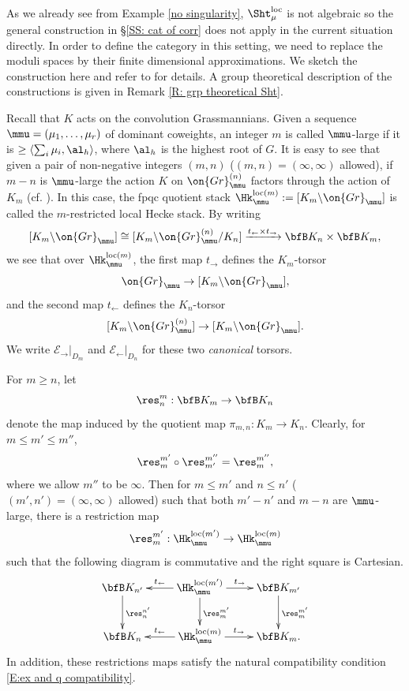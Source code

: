 \documentclass[11pt]{amsart}
\theoremstyle{definition}
\theoremstyle{definition}
\theoremstyle{definition}
\numberwithin{equation}{subsection}
\def\calE{\mathcal{E}}
\newcommand{\Gr}{{\on{Gr}}}
\newcommand{\loc}{\mathrm{loc}}
\newcommand{\leftone}{\leftarrow}
\newcommand{\rightone}{\to}
\begin{document}
As we already see from Example \ref{no singularity}, $\Sht^\loc_\mu$ is not algebraic so the general construction in \S \ref{SS: cat of corr} does not apply in the current situation directly. In order to define the category in this setting, we need to replace the moduli spaces by their finite dimensional approximations. 
We sketch the construction here and refer to  \cite[\S 5]{XZ} for details. A group theoretical description of the constructions is given in Remark \ref{R: grp theoretical Sht}.


Recall that $K$ acts on the convolution Grassmannians. Given a sequence $\mmu=(\mu_1,\ldots,\mu_r)$ of dominant coweights, an integer $m$ is called $\mmu$-large if it is $\geq \langle\sum_i\mu_i,\al_h\rangle$, where $\al_h$ is the highest root of $G$.
It is easy to see that given a pair of non-negative integers $(m,n)$ ($(m,n)=(\infty,\infty)$ allowed), if $m-n$ is $\mmu$-large
the action $K$ on $\Gr_\mmu^{(n)}$ factors through the action of $K_{m}$ (cf. \cite[Lemma 3.1.7]{XZ}). In this case, the fpqc quotient stack 
$\Hk^{\loc(m)}_\mmu:=[K_m\backslash \Gr_\mmu]$ is called the $m$-restricted local Hecke stack. 
By writing
\[
[K_m\backslash\Gr_\mmu]\cong [K_m\backslash\Gr^{(n)}_\mmu/K_n]\xrightarrow{t_\leftone\times t_\rightone} \bfB K_n\times \bfB K_m,
\]
we see that over $\Hk_{\mmu}^{\loc(m)}$, the first map $t_\rightone$ defines the $K_m$-torsor 
\begin{equation*}\label{torsor2}
\Gr_\mmu \to [K_m\backslash\Gr_\mmu],
\end{equation*}
and the second map $t_\leftone$ defines the $K_n$-torsor
\begin{equation*}\label{torsor1}
[K_m\backslash\Gr_{\mmu}^{(n)}]\to  [K_m\backslash\Gr_\mmu].
\end{equation*}
We write $\calE_{\rightone}|_{D_{m}}$ and $\calE_{\leftone}|_{D_n}$ for these two \emph{canonical} torsors. 

For $m\geq n$, let 
$$\res^m_n: \bfB K_m\to \bfB K_n$$ 
denote the map induced by the quotient map $\pi_{m,n}:K_m\to K_n$. Clearly, for $m\leq m'\leq m''$,
\begin{equation}
\label{E:ex and q compatibility}
\res_{m}^{m'} \circ \res_{m'}^{m''} = \res_{m}^{m''},
\end{equation}
where we allow $m''$ to be $\infty$.
Then for $m\leq m'$ and $n\leq n'$ ($(m',n')=(\infty,\infty)$ allowed) such that both $m'-n'$ and $m-n$ are $\mmu$-large, there
is a restriction map
$$\res^{m'}_m: \Hk^{\loc(m')}_{\mmu}\to \Hk^{\loc(m)}_{\mmu}$$ such that
the following diagram is commutative and the right square is Cartesian.
\begin{equation*}
\label{E:restriction and torsor commutative}
\xymatrix{
\bfB K_{n'} \ar[d]^{\res^{n'}_n} &
\Hk_\mmu^{\loc(m')} \ar[l]_-{t_\leftone} \ar[r]^-{t_\rightone} \ar[d]^{\res^{m'}_{m}} &  \bfB K_{m'} \ar[d]^{\res^{m'}_{m}}
\\ 
\bfB K_n & \Hk_\mmu^{\loc(m)} \ar[l]_-{t_\leftone} \ar[r]^-{t_\rightone} &  \bfB K_m.
}
\end{equation*}
In addition, these restrictions maps  satisfy the natural compatibility condition \eqref{E:ex and q compatibility}.
\end{document}
